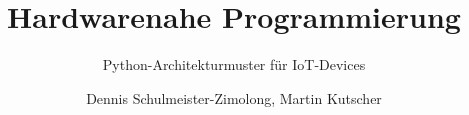 \title{Hardwarenahe Programmierung}
\subtitle{Python-Architekturmuster für IoT-Devices}
\author{Dennis Schulmeister-Zimolong, Martin Kutscher}

\renewcommand{\ubInstitute}{Studiengang Wirtschaftsinformatik}
\renewcommand{\ubModule}{IoT -- Technical Point of View}
\renewcommand{\ubType}{Aufgaben}
